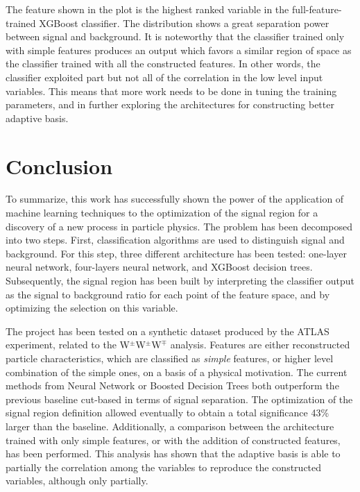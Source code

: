 \documentclass{article}
\begin{document}
The feature shown in the plot is the highest ranked variable in the full-feature-trained XGBoost classifier. The distribution shows a great separation power between signal and background. It is noteworthy that the classifier trained only with simple features produces an output which favors a similar region of space as the classifier trained with all the constructed features. In other words, the classifier exploited part but not all of the correlation in the low level input variables. This means that more work needs to be done in tuning the training parameters, and in further exploring the architectures for constructing better adaptive basis.

\section{Conclusion}
To summarize, this work has successfully shown the power of the application of machine learning techniques to the optimization of the signal region for a discovery of a new process in particle physics. The problem has been decomposed into two steps. First,  classification algorithms are used to distinguish signal and background. For this step, three different architecture has been tested: one-layer neural network, four-layers neural network, and XGBoost decision trees. Subsequently, the signal region has been built by interpreting the classifier output as the signal to background ratio for each point of the feature space, and by optimizing the selection on this variable.

The project has been tested on a synthetic dataset produced by the ATLAS experiment, related to the W$^{\pm}$W$^{\pm}$W$^{\mp}$ analysis. Features are either reconstructed particle characteristics, which are classified as \textit{simple} features, or higher level combination of the simple ones, on a basis of a physical motivation. The current methods from Neural Network or Boosted Decision Trees both outperform the previous baseline cut-based in terms of signal separation.
The optimization of the signal region definition allowed eventually to obtain a total significance 43\% larger than the baseline.
Additionally, a comparison between the architecture trained with only simple features, or with the addition of constructed features, has been performed. This analysis has shown that the adaptive basis is able to partially the correlation among the variables to reproduce the constructed variables, although only partially.
\end{document}
